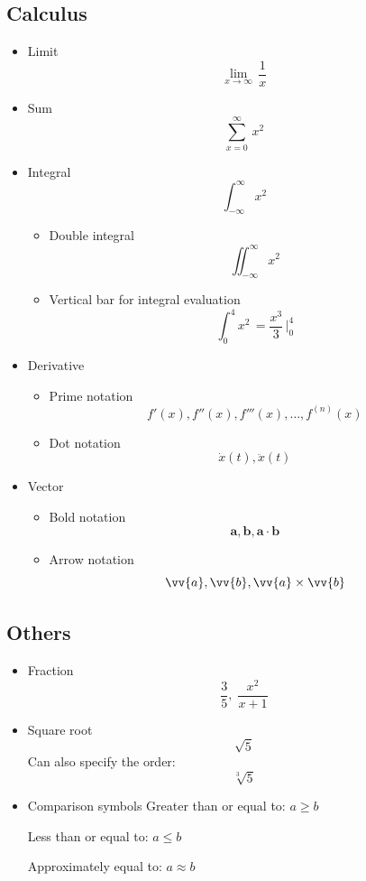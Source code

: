 \documentclass[a4paper, 12pt]{article}
\begin{document}
\subsection{Calculus}
\begin{itemize}
    \item Limit
    \[
    \lim_{x \to \infty} \, \frac{1}{x}
    \]
    \item Sum
    \[
    \sum_{x=0}^{\infty} \, x^2
    \]
    \item Integral
    \[
    \int_{- \infty}^\infty x^2
    \]
    \begin{itemize}
        \item Double integral
        \[
        \iint_{- \infty}^\infty x^2
        \]
        \item Vertical bar for integral evaluation
        \[
        \int_0^4 x^2 \, = \frac{x^3}{3} \, \bigg\vert_0^4
        \]
    \end{itemize}
    \item Derivative
    \begin{itemize}
        \item Prime notation
        \[
        f'(x), f''(x), f'''(x), \ldots, f^{(n)}(x)
        \]
        \item Dot notation
        \[
        \dot{x}(t), \ddot{x}(t)
        \]
    \end{itemize}
    \item Vector
    \begin{itemize}
        \item Bold notation
        \[
        \bm{a}, \bm {b}, \bm{a} \cdot \bm {b}
        \]
        \item Arrow notation
        \[
        \vv{a}, \vv{b}, \vv{a} \times \vv{b}
        \]
    \end{itemize}
\end{itemize}
\subsection{Others}
\begin{itemize}
    \item Fraction
    \[
    \frac{3}{5}, \; \frac{x^2}{x+1}
    \]
    \item Square root
    \[ \sqrt{5} \]
    Can also specify the order:
    \[ \sqrt[3]{5} \]
    \item Comparison symbols
    Greater than or equal to: \( a \geq b\)
    
    Less than or equal to: \( a \leq b\)
    
    Approximately equal to: \(a \approx b\)
\end{itemize}
\end{document}
